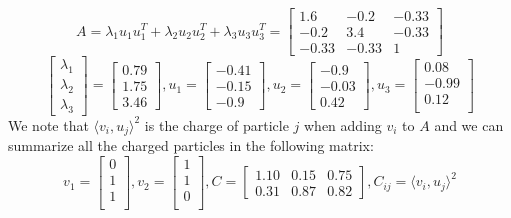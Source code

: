 \documentclass[
  letterpaper,
  DIV=11,
  numbers=noendperiod]{scrartcl}
\theoremstyle{plain}
\theoremstyle{plain}
\theoremstyle{plain}
\theoremstyle{definition}
\theoremstyle{remark}
\begin{document}
\[A = \lambda_1 u_1 u_1^T + \lambda_2 u_2 u_2^T + \lambda_3 u_3 u_3^T
 = \begin{bmatrix}
1.6 & -0.2 & -0.33\\
-0.2 & 3.4 & -0.33\\
-0.33 & -0.33 & 1
\end{bmatrix}\]
\[\begin{bmatrix}\lambda_1 \\ \lambda_2 \\ \lambda_3\end{bmatrix} = \begin{bmatrix}0.79 \\ 1.75 \\ 3.46\end{bmatrix}, u_1 = \begin{bmatrix}
-0.41\\
-0.15\\
-0.9
\end{bmatrix}, u_2 = \begin{bmatrix}
-0.9 \\
-0.03 \\
0.42
\end{bmatrix}, u_3 = \begin{bmatrix}
0.08\\
-0.99\\
0.12\\
\end{bmatrix}\] We note that \(\langle v_i, u_j \rangle^2\) is the
charge of particle \(j\) when adding \(v_i\) to \(A\) and we can
summarize all the charged particles in the following matrix:
\[v_1 = \begin{bmatrix}
0\\
1\\
1\\
\end{bmatrix}, v_2 = \begin{bmatrix}
1\\
1\\
0\\
\end{bmatrix}, 
C = \begin{bmatrix}
1.10 & 0.15 & 0.75\\
0.31 & 0.87 & 0.82
\end{bmatrix}, C_{ij} = \langle v_i, u_j \rangle^2\]
\end{document}
